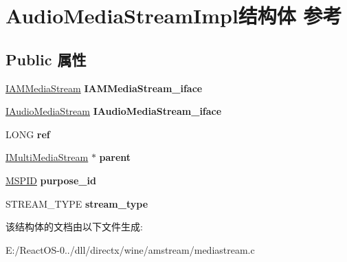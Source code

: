 \hypertarget{struct_audio_media_stream_impl}{}\section{Audio\+Media\+Stream\+Impl结构体 参考}
\label{struct_audio_media_stream_impl}
\subsection*{Public 属性}
\begin{DoxyCompactItemize}
\item 
\mbox{\label{struct_audio_media_stream_impl_a44832623612cf68346256b30cddd4e89}} 
\hyperlink{interface_i_a_m_media_stream}{I\+A\+M\+Media\+Stream} {\bfseries I\+A\+M\+Media\+Stream\+\_\+iface}
\item 
\mbox{\label{struct_audio_media_stream_impl_aa2d033539ad03d4462fb16c27de50db9}} 
\hyperlink{interface_i_audio_media_stream}{I\+Audio\+Media\+Stream} {\bfseries I\+Audio\+Media\+Stream\+\_\+iface}
\item 
\mbox{\label{struct_audio_media_stream_impl_ac628c9289769f1e5bdb6afd11803aabc}} 
L\+O\+NG {\bfseries ref}
\item 
\mbox{\label{struct_audio_media_stream_impl_a85428a654ea2668a0d01e6819c1eee60}} 
\hyperlink{interface_i_multi_media_stream}{I\+Multi\+Media\+Stream} $\ast$ {\bfseries parent}
\item 
\mbox{\label{struct_audio_media_stream_impl_a796c1dc664f84084c8b70b262d600db9}} 
\hyperlink{interface_g_u_i_d}{M\+S\+P\+ID} {\bfseries purpose\+\_\+id}
\item 
\mbox{\label{struct_audio_media_stream_impl_a79cc02c52879854f562c940d433793ac}} 
S\+T\+R\+E\+A\+M\+\_\+\+T\+Y\+PE {\bfseries stream\+\_\+type}
\end{DoxyCompactItemize}


该结构体的文档由以下文件生成\+:\begin{DoxyCompactItemize}
\item 
E\+:/\+React\+O\+S-\/0../dll/directx/wine/amstream/mediastream.\+c\end{DoxyCompactItemize}
